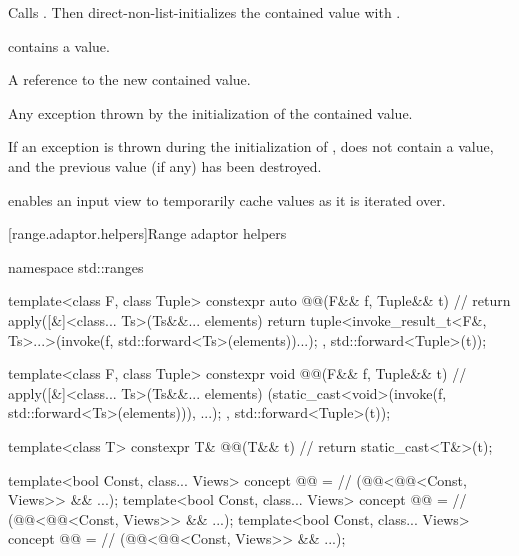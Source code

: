 \begin{itemize}
\begin{itemdescr}
 \effects
Calls .
Then direct-non-list-initializes the contained value with .

 \ensures
{} contains a value.

 \returns
A reference to the new contained value.

 \throws
Any exception thrown by the initialization of the contained value.

 \remarks
If an exception is thrown during the initialization of ,
 does not contain a value, and
the previous value (if any) has been destroyed.
\end{itemdescr}
\end{itemize}

\pnum
\begin{note}
 enables an input view
to temporarily cache values as it is iterated over.
\end{note}

[range.adaptor.helpers]{Range adaptor helpers}

\begin{codeblock}
namespace std::ranges {
  template<class F, class Tuple>
  constexpr auto @@(F&& f, Tuple&& t) { // \expos
    return apply([&]<class... Ts>(Ts&&... elements) {
      return tuple<invoke_result_t<F&, Ts>...>(invoke(f, std::forward<Ts>(elements))...);
    }, std::forward<Tuple>(t));
  }

  template<class F, class Tuple>
  constexpr void @@(F&& f, Tuple&& t) { // \expos
    apply([&]<class... Ts>(Ts&&... elements) {
      (static_cast<void>(invoke(f, std::forward<Ts>(elements))), ...);
    }, std::forward<Tuple>(t));
  }

  template<class T>
  constexpr T& @@(T&& t) {                   // \expos
    return static_cast<T&>(t);
  }

  template<bool Const, class... Views>
    concept @@ =                     // \expos
      (@@<@@<Const, Views>> && ...);
  template<bool Const, class... Views>
    concept @@ =                     // \expos
      (@@<@@<Const, Views>> && ...);
  template<bool Const, class... Views>
    concept @@ =                           // \expos
      (@@<@@<Const, Views>> && ...);
}
\end{codeblock}

